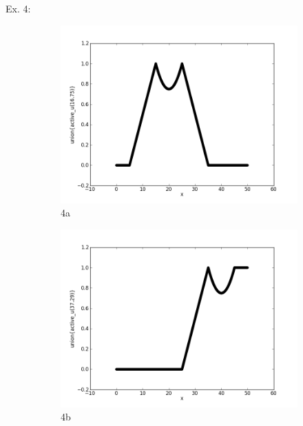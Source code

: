 \documentclass{report}
\begin{document}
Ex. 4:
\begin{figure}[ht]
        \begin{subfigure}[b]{0.5\textwidth}
                \centering
                \includegraphics[width=\textwidth]{ex4a.png}
                \caption{4a}
        \end{subfigure}
	\begin{subfigure}[b]{0.5\textwidth}
                \centering
                \includegraphics[width=\textwidth]{ex4b.png}
                \caption{4b}
	\end{subfigure}
	\begin{subfigure}[b]{0.5\textwidth}
                \centering

\end{subfigure}
\end{figure}
\end{document}
